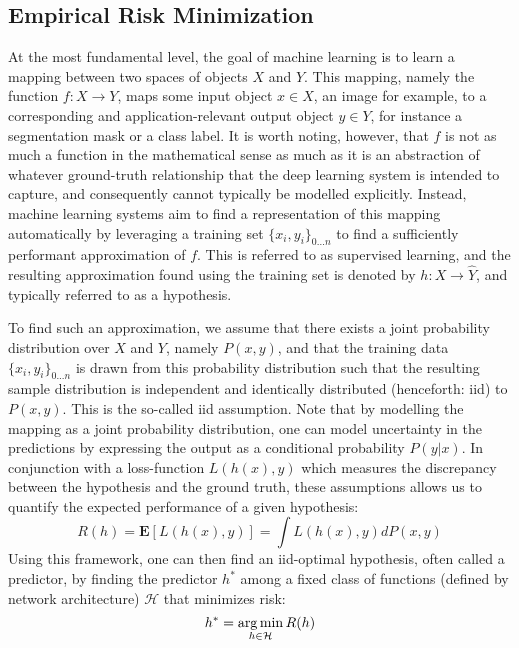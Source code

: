 	\subsection{Empirical Risk Minimization} 
	
		At the most fundamental level, the goal of machine learning is to learn a mapping between two spaces of objects \(X\) and \(Y\). This mapping, namely the function \(f: X \rightarrow Y\), maps some input object \(x \in X\), an image for example, to a corresponding and application-relevant output object \(y \in Y\), for instance a segmentation mask or a class label. It is worth noting, however, that \(f\) is not as much a function in the mathematical sense as much as it is an abstraction of whatever ground-truth relationship that the deep learning system is intended to capture, and consequently cannot typically be modelled explicitly. Instead, machine learning systems aim to find a representation of this mapping automatically by leveraging a training set \(\{x_i, y_i\}_{0...n}\) to find a sufficiently performant approximation of \(f\). This is referred to as supervised learning, and the resulting approximation found using the training set is denoted by \(h: X \rightarrow \hat{Y}\), and typically referred to as a hypothesis.  
		        
		To find such an approximation, we assume that there exists a joint probability distribution over \(X\) and \(Y\), namely \(P(x,y)\), and that the training data \(\{x_i, y_i\}_{0...n}\) is drawn from this probability distribution such that the resulting sample distribution is independent and identically distributed (henceforth: iid) to \(P(x,y)\). This is the so-called iid assumption. Note that by modelling the mapping as a joint probability distribution, one can model uncertainty in the predictions by expressing the output as a conditional probability \(P(y|x)\). In conjunction with a loss-function \(L(h(x),y)\) which measures the discrepancy between the hypothesis and the ground truth, these assumptions allows us to quantify the expected performance of a given hypothesis:
		\begin{equation}
		    R(h) = \boldsymbol{E}[L(h(x),y)] = \int L(h(x),y) dP(x,y)
		\end{equation}
		Using this framework, one can then find an iid-optimal hypothesis, often called a predictor, by finding the predictor \(h^*\) among a fixed class of functions (defined by network architecture) \(\mathcal{H}\) that minimizes risk:
		\begin{equation}
		h^* = \operatorname*{arg\,min}_{h \in \mathcal{H}}R(h)
		\end{equation}
		
